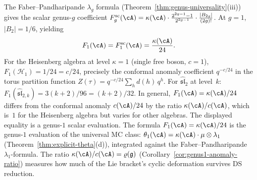 \begin{remark}\label{rem:genus-1-verification}
The Faber--Pandharipande $\lambda_g$ formula (Theorem~\ref{thm:genus-universality}(iii))
gives the scalar genus-$g$ coefficient
$F_g^{\mathrm{sc}}(\cA)=\kappa(\cA)\cdot
\frac{2^{2g-1}-1}{2^{2g-1}}\cdot \frac{|B_{2g}|}{(2g)!}$.
At $g = 1$, $|B_2| = 1/6$, yielding
\[
F_1(\cA)=F_1^{\mathrm{sc}}(\cA)=\frac{\kappa(\cA)}{24}.
\]
For the Heisenberg algebra at level $\kappa = 1$ (single free boson, $c = 1$),
$F_1(\mathcal{H}_1) = 1/24 = c/24$, precisely the conformal anomaly coefficient
$q^{-c/24}$ in the torus partition function $Z(\tau) = q^{-c/24}\sum_h d(h)\,q^h$.
For $\widehat{\mathfrak{sl}}_2$ at level~$k$:
$F_1(\widehat{\mathfrak{sl}}_{2,k}) = 3(k{+}2)/96 = (k{+}2)/32$.
In general, $F_1(\cA)=\kappa(\cA)/24$ differs from the conformal anomaly
$c(\cA)/24$ by the ratio $\kappa(\cA)/c(\cA)$, which is~$1$ for the
Heisenberg algebra but varies for other algebras.
The displayed equality is a genus-$1$ scalar evaluation. The formula
$F_1(\cA)=\kappa(\cA)/24$ is the genus-$1$ evaluation
of the universal MC class: $\theta_1(\cA)=\kappa(\cA) \cdot \mu
\otimes \lambda_1$
(Theorem~\ref{thm:explicit-theta}(d)), integrated
against the Faber--Pandharipande $\lambda_1$-formula.
The ratio $\kappa(\cA)/c(\cA) = \varrho(\mathfrak{g})$
(Corollary~\ref{cor:genus1-anomaly-ratio}) measures
how much of the Lie bracket's cyclic deformation
survives DS reduction.
\end{remark}

